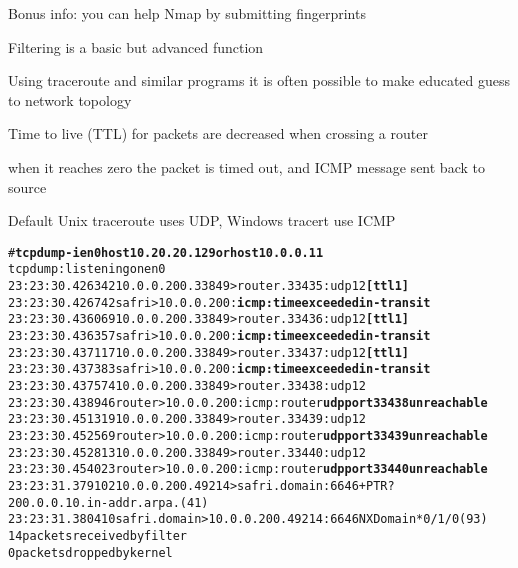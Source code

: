 \documentclass[Screen16to9,17pt]{foils}
\begin{document}
Bonus info: you can help Nmap by submitting fingerprints





\centerline{}



\centerline{Filtering is a basic but advanced function}



\begin{list1}
\item Using traceroute and similar programs it is often possible to make educated guess to network topology
\item Time to live (TTL) for packets are decreased when crossing a router
\item when it reaches zero the packet is timed out, and ICMP message sent back to source
\item Default Unix traceroute uses UDP, Windows tracert use ICMP
\end{list1}



\begin{alltt}
\footnotesize # {\bfseries tcpdump -i en0 host 10.20.20.129 or host 10.0.0.11}
tcpdump: listening on en0
23:23:30.426342 10.0.0.200.33849 > router.33435: udp 12 {\bf [ttl 1]}
23:23:30.426742 safri > 10.0.0.200: {\bf icmp: time exceeded in-transit}
23:23:30.436069 10.0.0.200.33849 > router.33436: udp 12 {\bf [ttl 1]}
23:23:30.436357 safri > 10.0.0.200: {\bf icmp: time exceeded in-transit}
23:23:30.437117 10.0.0.200.33849 > router.33437: udp 12 {\bf [ttl 1]}
23:23:30.437383 safri > 10.0.0.200: {\bf icmp: time exceeded in-transit}
23:23:30.437574 10.0.0.200.33849 > router.33438: udp 12
23:23:30.438946 router > 10.0.0.200: icmp: router {\bf udp port 33438 unreachable}
23:23:30.451319 10.0.0.200.33849 > router.33439: udp 12
23:23:30.452569 router > 10.0.0.200: icmp: router {\bf udp port 33439 unreachable}
23:23:30.452813 10.0.0.200.33849 > router.33440: udp 12
23:23:30.454023 router > 10.0.0.200: icmp: router {\bf udp port 33440 unreachable}
23:23:31.379102 10.0.0.200.49214 > safri.domain:  6646+ PTR?
200.0.0.10.in-addr.arpa. (41)
23:23:31.380410 safri.domain > 10.0.0.200.49214:  6646 NXDomain* 0/1/0 (93)
14 packets received by filter
0 packets dropped by kernel
\end{alltt}
\end{document}
